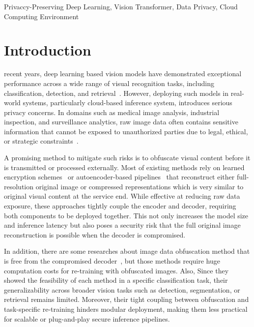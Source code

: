 \documentclass{ieeeaccess}
\begin{document}
\begin{keywords}
Privaccy-Preserving Deep Learning, Vision Transformer, Data Privacy, Cloud Computing Environment
\end{keywords}

\titlepgskip=-21pt

\maketitle

\section{Introduction} \label{sec:intro}

 recent years, deep learning based vision models have demonstrated exceptional performance across a wide range of visual recognition tasks, including classification, detection, and retrieval~\cite{VoulodimosDeep2018, CHAI2021100134, Alsajri_Hacimahmud_2023, TSIRTSAKIS2025298}. However, deploying such models in real-world systems, particularly cloud-based inference system, introduces serious privacy concerns. In domains such as medical image analysis, industrial inspection, and surveillance analytics, raw image data often contains sensitive information that cannot be exposed to unauthorized parties due to legal, ethical, or strategic constraints~\cite{Grünberg2017,info:doi/10.2196/22269, Padmapriya2024, 01630814-202314060-00005, app132312727}.

A promising method to mitigate such risks is to obfuscate visual content before it is transmitted or processed externally. Most of existing methods rely on learned encryption schemes~\cite{TANWAR2022103503,10.1145/3570165,Madani_2025} or autoencoder-based pipelines~\cite{s23010519,Zhou2024,SHIRI2024104583,10781629} that reconstruct either full-resolution original image or compressed representations which is very similar to original visual content at the service end. While effective at reducing raw data exposure, these approaches tightly couple the encoder and decoder, requiring both components to be deployed together. This not only increases the model size and inference latency but also poses a security risk that the full original image reconstruction is possible when the decoder is compromised.

In addition, there are some researches about image data obfuscation method that is free from the compromised decoder~\cite{9129656,10.1007/978-3-031-37586-6_18,s24103166}, but those methods require huge computation costs for re-training with obfuscated images. Also, Since they showed the feasibility of each method in a specific classification task, their generalizability across broader vision tasks such as detection, segmentation, or retrieval remains limited. Moreover, their tight coupling between obfuscation and task-specific re-training hinders modular deployment, making them less practical for scalable or plug-and-play secure inference pipelines.
\end{document}

